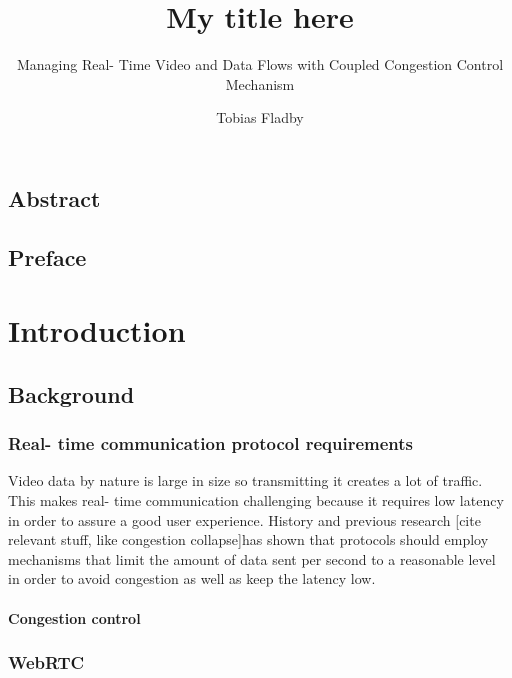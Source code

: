 \documentclass[UKenglish]{ifimaster}  %
\title{My title here}        %
\subtitle{Managing Real- Time Video and Data Flows with Coupled Congestion Control Mechanism}         %
\author{Tobias Fladby}                      %
\begin{document}
\duoforside[dept={Department of Informatics},   %
  program={programming and system architecture},  %
  long]                                        %

\frontmatter{}
\chapter*{Abstract}                   %

\tableofcontents{}
\listoffigures{}
\listoftables{}

\chapter*{Preface}                    %

\mainmatter{}
\part{Introduction}                   %

\chapter{Background}
\section{Real- time communication protocol requirements}
Video data by nature is large in size so transmitting it creates a lot of traffic. 
This makes real- time communication challenging because it requires low latency in order to assure a good user experience. 
History and previous research [cite relevant stuff, like congestion collapse]has shown that protocols should employ mechanisms that limit the amount of data sent per second to a reasonable level in order to avoid congestion as well as keep the latency low.
\subsection{Congestion control}
  

\section{WebRTC}
\end{document}
